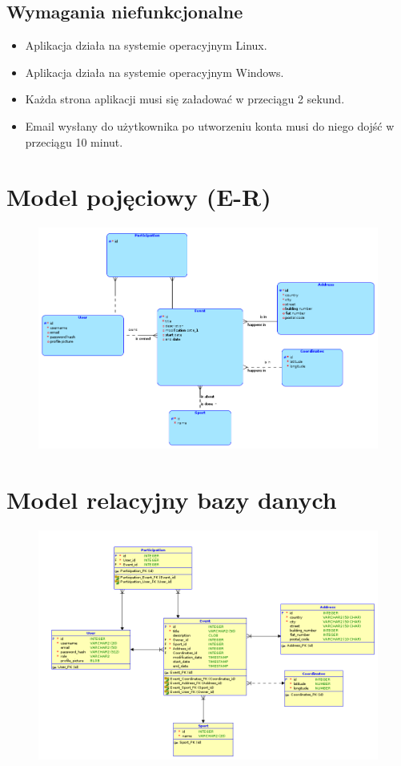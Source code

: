 \documentclass[11pt,a4paper]{article}
\begin{document}
\subsection{Wymagania niefunkcjonalne}

\begin{itemize}
    \item Aplikacja działa na systemie operacyjnym Linux.
    \item Aplikacja działa na systemie operacyjnym Windows.
    \item Każda strona aplikacji musi się załadować w przeciągu 2 sekund.
    \item Email wysłany do użytkownika po utworzeniu konta musi do niego dojść w przeciągu 10 minut.
\end{itemize}

\section{Model pojęciowy (E-R)}

\begin{figure} [H]
    \centering
    \includegraphics[width=0.95\linewidth]{../model/model_er.png}
\end{figure}

\section{Model relacyjny bazy danych}

\begin{figure} [H]
    \centering
    \includegraphics[width=0.95\linewidth]{../model/model_rel.png}
\end{figure}
\end{document}
